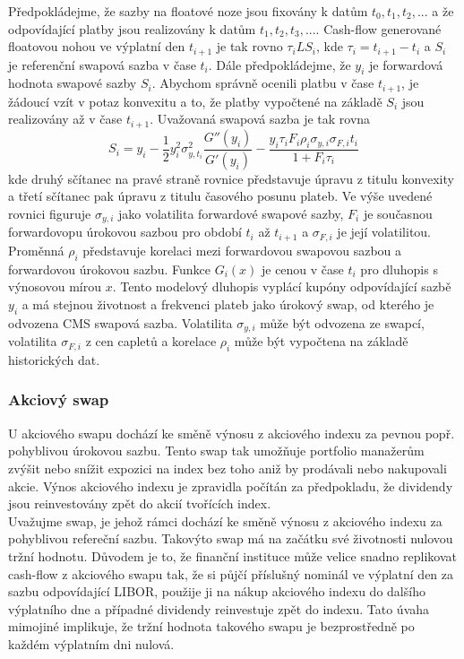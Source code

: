 \documentclass[a4paper]{book}
\begin{document}
Předpokládejme, že sazby na floatové noze jsou fixovány k datům $t_0, t_1, t_2, ...$ a že odpovídající platby jsou realizovány k datům $t_1, t_2, t_3,...$. Cash-flow generované floatovou nohou ve výplatní den $t_{i+1}$ je tak rovno $\tau_i L S_i$, kde $\tau_i = t_{i+1}-t_i$ a $S_i$ je referenční swapová sazba v čase $t_i$. Dále předpokládejme, že $y_i$ je forwardová hodnota swapové sazby $S_i$. Abychom správně ocenili platbu v čase $t_{i+1}$, je žádoucí vzít v potaz konvexitu a to, že platby vypočtené na základě $S_i$ jsou realizovány až v čase $t_{i+1}$. Uvažovaná swapová sazba je tak rovna
\begin{equation*}
S_i = y_i - \frac{1}{2}y^2_i \sigma^2_{y,t_i}\frac{G''(y_i)}{G'(y_i)}-\frac{y_i \tau_i F_i \rho_i \sigma_{y,i}\sigma_{F,i}t_i}{1 + F_i \tau_i}
\end{equation*}
kde druhý sčítanec na pravé straně rovnice představuje úpravu z titulu konvexity a třetí sčítanec pak úpravu z titulu časového posunu plateb. Ve výše uvedené rovnici figuruje $\sigma_{y,i}$ jako volatilita forwardové swapové sazby, $F_i$ je současnou forwardovopu úrokovou sazbou pro období $t_i$ až $t_{i+1}$ a $\sigma_{F,i}$ je její volatilitou. Proměnná $\rho_i$ představuje korelaci mezi forwardovou swapovou sazbou a forwardovou úrokovou sazbu. Funkce $G_i(x)$ je cenou v čase $t_i$ pro dluhopis s výnosovou mírou $x$. Tento modelový dluhopis vyplácí kupóny odpovídající sazbě $y_i$ a má stejnou životnost a frekvenci plateb jako úrokový swap, od kterého je odvozena CMS swapová sazba. Volatilita $\sigma_{y,i}$ může být odvozena ze swapcí, volatilita $\sigma_{F,i}$ z cen capletů a korelace $\rho_i$ může být vypočtena na základě historických dat.

\subsubsection{Akciový swap}

U akciového swapu dochází ke směně výnosu z akciového indexu za pevnou popř. pohyblivou úrokovou sazbu. Tento swap tak umožňuje portfolio manažerům zvýšit nebo snížit expozici na index bez toho aniž by prodávali nebo nakupovali akcie. Výnos akciového indexu je zpravidla počítán za předpokladu, že dividendy jsou reinvestovány zpět do akcií tvořících index.\\

Uvažujme swap, je jehož rámci dochází ke směně výnosu z akciového indexu za pohyblivou refereční sazbu. Takovýto swap má na začátku své životnosti nulovou tržní hodnotu. Důvodem je to, že finanční instituce může velice snadno replikovat cash-flow z akciového swapu tak, že si půjčí příslušný nominál ve výplatní den za sazbu odpovídající LIBOR, použije ji na nákup akciového indexu do dalšího výplatního dne a případné dividendy reinvestuje zpět do indexu. Tato úvaha mimojiné implikuje, že tržní hodnota takového swapu je bezprostředně po každém výplatním dni nulová.\\
\end{document}
